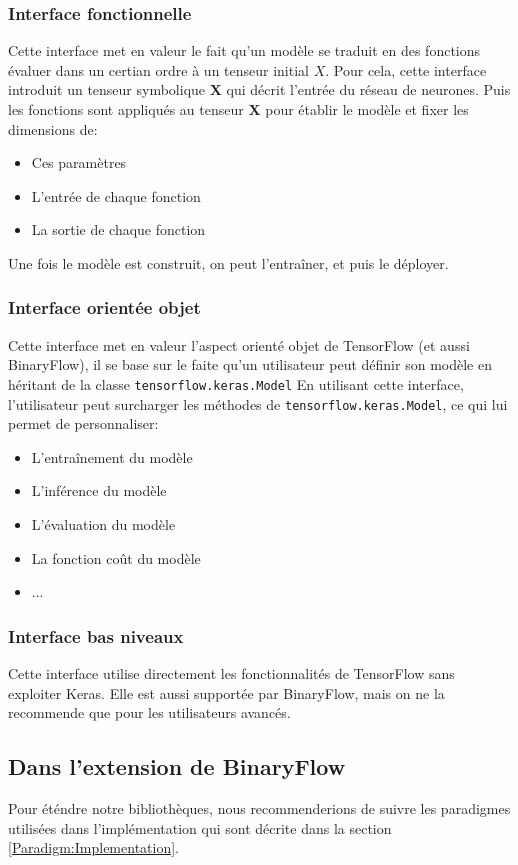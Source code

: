 \subsubsection{Interface fonctionnelle}
Cette interface met en valeur le fait qu'un modèle se traduit en des fonctions évaluer dans un certian ordre à un tenseur initial $X$.
\newline Pour cela, cette interface introduit un tenseur symbolique $\boldsymbol{X}$ qui décrit l'entrée du réseau de neurones. Puis les fonctions sont appliqués au tenseur $\boldsymbol{X}$ pour établir le modèle et fixer les dimensions de:
\begin{itemize}
	\item Ces paramètres
	\item L'entrée de chaque fonction
	\item La sortie de chaque fonction
\end{itemize}
Une fois le modèle est construit, on peut l'entraîner, et puis le déployer.

\subsubsection{Interface orientée objet}
Cette interface met en valeur l'aspect orienté objet de TensorFlow (et aussi BinaryFlow), il se base sur le faite qu'un utilisateur peut définir son modèle en héritant de la classe \texttt{tensorflow.keras.Model}
\newline En utilisant cette interface, l'utilisateur peut surcharger les méthodes de \texttt{tensorflow.keras.Model}, ce qui lui permet de personnaliser:
\begin{itemize}
	\item L'entraînement du modèle
	\item L'inférence du modèle
	\item L'évaluation du modèle
	\item La fonction coût du modèle
	\item ...
\end{itemize}

\subsubsection{Interface bas niveaux}
Cette interface utilise directement les fonctionnalités de TensorFlow sans exploiter Keras. Elle est aussi supportée par BinaryFlow, mais on ne la recommende que pour les utilisateurs avancés.

\subsection{Dans l'extension de BinaryFlow}
Pour éténdre notre bibliothèques, nous recommenderions de suivre les paradigmes utilisées dans l'implémentation qui sont décrite dans la section \ref{Paradigm:Implementation}.

